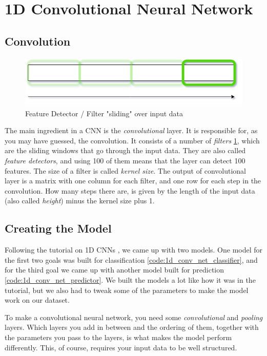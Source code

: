 \section{1D Convolutional Neural Network}

\subsection{Convolution}
\begin{figure}
    \includegraphics[height=2.5cm]{img/feature_detector.png}
    \caption{Feature Detector / Filter "sliding" over input data}
    \label{figure:feature_detector}
\end{figure}

The main ingredient in a CNN is the \textit{convolutional} layer. It is responsible for, as you may have guessed, the convolution.
It consists of a number of \textit{filters} \ref{figure:feature_detector}, which are the sliding windows that go through the input data. 
They are also called \textit{feature detectors}, and using 100 of them means that the layer can detect 100 features. 
The size of a filter is called \textit{kernel size}. The output of convolutional layer is a matrix with one column for each filter, and one row for each step
in the convolution. How many steps there are, is given by the length of the input data (also called \textit{height}) minus the kernel size plus 1.


\subsection{Creating the Model}
Following the tutorial on 1D CNNs \cite{1d_cnn}, we came up with two models. 
One model for the first two goals was built for classification \ref{code:1d_conv_net_classifier}, and for the third goal we came up with another model built for 
prediction \ref{code:1d_conv_net_predictor}. We built the models a lot like how it was in the tutorial, 
but we also had to tweak some of the parameters to make the model work on our dataset.

To make a convolutional neural network, you need some \textit{convolutional} and \textit{pooling} layers.
Which layers you add in between and the ordering of them, together with the parameters you pass to the layers, 
is what makes the model perform differently. This, of course, requires your input data to be well structured.

